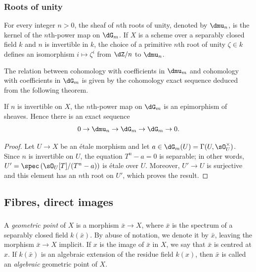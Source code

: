 \documentclass[oneside]{book}
\begin{document}
\subsubsection{Roots of unity}\label{I:2-2-4}

For every integer $n>0$, the sheaf of $n$th roots of unity, denoted by
$\dmu_n$, is the kernel of the $n$th-power map on $\dG_m$.
If $X$ is a scheme over a separably closed field $k$ and $n$ is
invertible in $k$, the choice of a primitive $n$th root of unity
$\zeta\in k$ defines an isomorphism $i\mapsto\zeta^i$ from $\dZ/n$ to
$\dmu_n$.

The relation between cohomology with coefficients in $\dmu_m$ and
cohomology with coefficients in $\dG_m$ is given by the cohomology exact
sequence deduced from the following theorem.

\begin{theorem}\label{I:2-2-5}
If $n$ is invertible on $X$, the $n$th-power map on $\dG_m$ is an
epimorphism of sheaves. Hence there is an exact sequence
\[
  0 \to \dmu_n \to \dG_m \to \dG_m \to 0\text{.}
\]
\end{theorem}
\begin{proof}
Let $U\to X$ be an étale morphism and let
$a\in\dG_m(U)=\Gamma(U,\sO_U^\times)$. Since $n$ is invertible on $U$,
the equation $T^n-a=0$ is separable; in other words,
$U'=\spec\left(\sO_U[T]/(T^n-a)\right)$ is étale over $U$. Moreover,
$U'\to U$ is surjective and this element has an $n$th root on $U'$, which proves
the result.
\end{proof}

\subsection{Fibres, direct images}\label{I:2-3}

\subsubsection{}\label{I:2-3-1}

A \emph{geometric point} of $X$ is a morphism $\bar x\to X$, where
$\bar x$ is the spectrum of a separably closed field $k(\bar x)$. By
abuse of notation, we denote it by $\bar x$, leaving the morphism
$\bar x\to X$ implicit. If $x$ is the image of $\bar x$ in $X$, we say
that $\bar x$ is centred at $x$. If $k(\bar x)$ is an algebraic extension
of the residue field $k(x)$, then $\bar x$ is called an
\emph{algebraic} geometric point of $X$.
\end{document}

